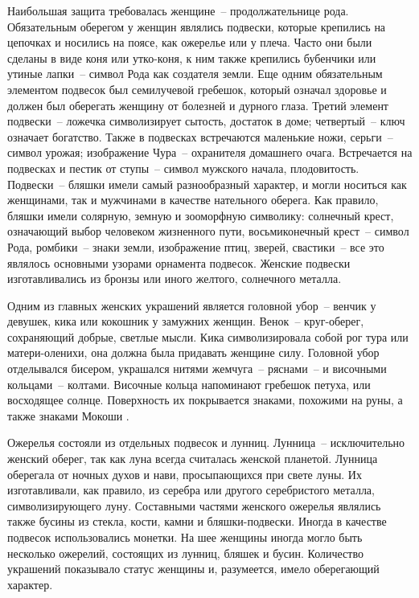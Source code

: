 \documentclass[pscyr,titlepage,chapters]{hedreport}
\begin{document}
  Наибольшая защита требовалась женщине~-- продолжательнице рода. Обязательным
  оберегом у женщин являлись подвески, которые крепились на цепочках и носились
  на поясе, как ожерелье или у плеча. Часто они были сделаны в виде коня или
  утко-коня, к ним также крепились бубенчики или утиные лапки~-- символ Рода как
  создателя земли. Еще одним обязательным элементом подвесок был семилучевой
  гребешок, который означал здоровье и должен был оберегать женщину от болезней
  и дурного глаза. Третий элемент подвески~-- ложечка символизирует сытость,
  достаток в доме; четвертый~-- ключ означает богатство. Также в подвесках
  встречаются маленькие ножи, серьги~-- символ урожая; изображение Чура~--
  охранителя домашнего очага. Встречается на подвесках и пестик от ступы~--
  символ мужского начала, плодовитость. Подвески~-- бляшки имели самый
  разнообразный характер, и могли носиться как женщинами, так и мужчинами в
  качестве нательного оберега. Как правило, бляшки имели солярную, земную и
  зооморфную символику: солнечный крест, означающий выбор человеком жизненного
  пути, восьмиконечный крест~-- символ Рода, ромбики~-- знаки земли, изображение
  птиц, зверей, свастики~-- все это являлось основными узорами орнамента
  подвесок. Женские подвески изготавливались из бронзы или иного желтого,
  солнечного металла.

  Одним из главных женских украшений является головной убор~-- венчик у девушек,
  кика или кокошник у замужних женщин. Венок~-- круг-оберег, сохраняющий добрые,
  светлые мысли. Кика символизировала собой рог тура или матери-оленихи, она
  должна была придавать женщине силу. Головной убор отделывался бисером,
  украшался нитями жемчуга~-- ряснами~-- и височными кольцами~-- колтами.
  Височные кольца напоминают гребешок петуха, или восходящее солнце. Поверхность
  их покрывается знаками, похожими на руны, а также знаками Мокоши \cite{6}.

  Ожерелья состояли из отдельных подвесок и лунниц. Лунница~-- исключительно
  женский оберег, так как луна всегда считалась женской планетой. Лунница
  оберегала от ночных духов и нави, просыпающихся при свете луны. Их
  изготавливали, как правило, из серебра или другого серебристого металла,
  символизирующего луну. Составными частями женского ожерелья являлись также
  бусины из стекла, кости, камни и бляшки-подвески. Иногда в качестве подвесок
  использовались монетки. На шее женщины иногда могло быть несколько ожерелий,
  состоящих из лунниц, бляшек и бусин. Количество украшений показывало статус
  женщины и, разумеется, имело оберегающий характер.
\end{document}

